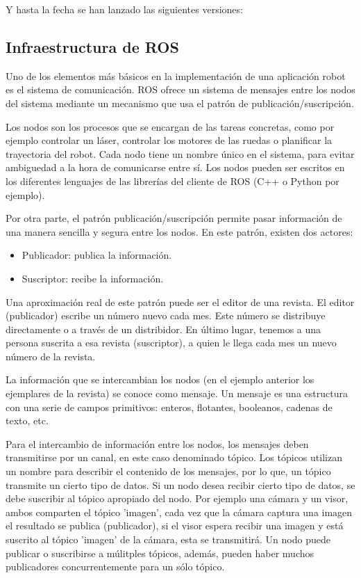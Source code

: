 Y hasta la fecha se han lanzado las siguientes versiones:



\subsection{Infraestructura de ROS}
Uno de los elementos más básicos en la implementación de una aplicación robot es
el sistema de comunicación. ROS ofrece un sistema de mensajes entre los nodos
del sistema mediante un mecanismo que usa el patrón de publicación/suscripción.

Los nodos son los procesos que se encargan de las tareas concretas, como por
ejemplo controlar un láser, controlar los motores de las ruedas o planificar la
trayectoria del robot. Cada nodo tiene un nombre único en el sistema, para
evitar ambiguedad a la hora de comunicarse entre sí. Los nodos pueden ser
escritos en los diferentes lenguajes de las librerías del cliente de ROS (C++ o
Python por ejemplo).

Por otra parte, el patrón publicación/suscripción permite pasar información de
una manera sencilla y segura entre los nodos. En este patrón, existen dos
actores:

\begin{itemize}
  \item Publicador: publica la información.
  \item Suscriptor: recibe la información.
\end{itemize}

Una aproximación real de este patrón puede ser el editor de una revista. El
editor (publicador) escribe un número nuevo cada mes. Este número se distribuye
directamente o a través de un distribidor. En último lugar, tenemos a una
persona suscrita a esa revista (suscriptor), a quien le llega cada mes un nuevo
número de la revista.

La información que se intercambian los nodos (en el ejemplo anterior los
ejemplares de la revista) se conoce como mensaje. Un mensaje es una estructura
con una serie de campos primitivos: enteros, flotantes, booleanos, cadenas de
texto, etc.

Para el intercambio de información entre los nodos, los mensajes deben
transmitirse por un canal, en este caso denominado tópico. Los tópicos utilizan
un nombre para describir el contenido de los mensajes, por lo que, un tópico
transmite un cierto tipo de datos. Si un nodo desea recibir cierto tipo de
datos, se debe suscribir al tópico apropiado del nodo. Por ejemplo una cámara y
un visor, ambos comparten el tópico 'imagen', cada vez que la cámara captura una
imagen el resultado se publica (publicador), si el visor espera recibir una
imagen y está suscrito al tópico 'imagen' de la cámara, esta se transmitirá. Un
nodo puede publicar o suscribirse a múlitples tópicos, además, pueden haber
muchos publicadores concurrentemente para un sólo tópico.

